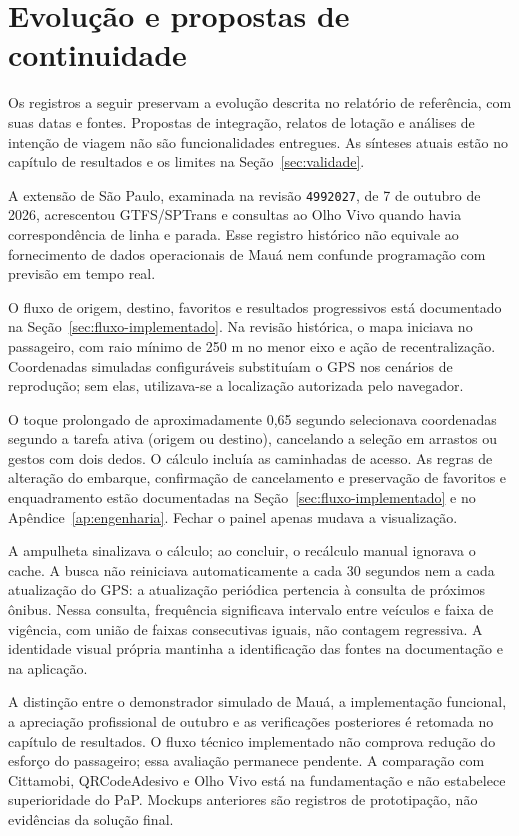\chapter{Evolução e propostas de continuidade}\label{ap:notas-historicas}
Os registros a seguir preservam a evolução descrita no relatório de referência, com suas datas e fontes. Propostas de integração, relatos de lotação e análises de intenção de viagem não são funcionalidades entregues. As sínteses atuais estão no capítulo de resultados e os limites na Seção~\ref{sec:validade}.

A extensão de São Paulo, examinada na revisão \texttt{4992027}, de 7 de outubro de 2026, acrescentou GTFS/SPTrans e consultas ao Olho Vivo quando havia correspondência de linha e parada. Esse registro histórico não equivale ao fornecimento de dados operacionais de Mauá nem confunde programação com previsão em tempo real.

O fluxo de origem, destino, favoritos e resultados progressivos está documentado na Seção~\ref{sec:fluxo-implementado}. Na revisão histórica, o mapa iniciava no passageiro, com raio mínimo de 250 m no menor eixo e ação de recentralização. Coordenadas simuladas configuráveis substituíam o GPS nos cenários de reprodução; sem elas, utilizava-se a localização autorizada pelo navegador.

O toque prolongado de aproximadamente 0,65 segundo selecionava coordenadas segundo a tarefa ativa (origem ou destino), cancelando a seleção em arrastos ou gestos com dois dedos. O cálculo incluía as caminhadas de acesso. As regras de alteração do embarque, confirmação de cancelamento e preservação de favoritos e enquadramento estão documentadas na Seção~\ref{sec:fluxo-implementado} e no Apêndice~\ref{ap:engenharia}. Fechar o painel apenas mudava a visualização.

A ampulheta sinalizava o cálculo; ao concluir, o recálculo manual ignorava o cache. A busca não reiniciava automaticamente a cada 30 segundos nem a cada atualização do GPS: a atualização periódica pertencia à consulta de próximos ônibus. Nessa consulta, frequência significava intervalo entre veículos e faixa de vigência, com união de faixas consecutivas iguais, não contagem regressiva. A identidade visual própria mantinha a identificação das fontes na documentação e na aplicação.

A distinção entre o demonstrador simulado de Mauá, a implementação funcional, a apreciação profissional de outubro e as verificações posteriores é retomada no capítulo de resultados. O fluxo técnico implementado não comprova redução do esforço do passageiro; essa avaliação permanece pendente. A comparação com Cittamobi, QRCodeAdesivo e Olho Vivo está na fundamentação e não estabelece superioridade do PaP. Mockups anteriores são registros de prototipação, não evidências da solução final.

